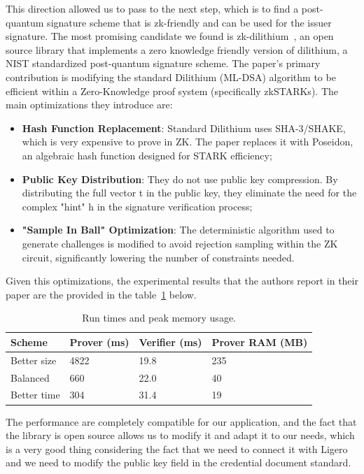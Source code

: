 \documentclass[binding=0.6cm,oneside,noexaminfo]{sapthesis}
\begin{document}
This direction allowed us to pass to the next step, which is to find a post-quantum signature scheme that is zk-friendly and can be used for the issuer signature.
The most promising candidate we found is zk-dilithium~\cite{policharla2023postquantum}, an open source library that implements
a zero knowledge friendly version of dilithium, a NIST standardized post-quantum signature scheme.
The paper's primary contribution is modifying the standard Dilithium (ML-DSA) algorithm to be efficient within a Zero-Knowledge 
proof system (specifically zkSTARKs). The main optimizations they introduce are:
\begin{itemize}
      \item \textbf{Hash Function Replacement}: Standard Dilithium uses SHA-3/SHAKE, which is very expensive to prove in ZK. 
      The paper replaces it with Poseidon, an algebraic hash function designed for STARK efficiency;
      \item \textbf{Public Key Distribution}: They do not use public key compression. By distributing the full vector t in 
      the public key, they eliminate the need for the complex "hint" h in the signature verification process;
      \item \textbf{"Sample In Ball" Optimization}: The deterministic algorithm used to generate challenges is modified to 
      avoid rejection sampling within the ZK circuit, significantly lowering the number of constraints needed.
\end{itemize}
Given this optimizations, the experimental results that the authors report in their paper are the provided in the table~\ref{tab:runtimes_memory} below.


\begin{table}[ht]
  \centering
  \caption{Run times and peak memory usage.}
  \label{tab:runtimes_memory}
  \small
  \begin{tabularx}{\textwidth}{@{}l X X X@{}}
    \toprule
    \textbf{Scheme} & \textbf{Prover (ms)} & \textbf{Verifier (ms)} & \textbf{Prover RAM (MB)} \\
    \midrule
    Better size & 4822 & 19.8 & 235 \\
    Balanced    & 660  & 22.0 & 40 \\
    Better time & 304  & 31.4 & 19 \\
    \bottomrule
  \end{tabularx}
\end{table}

The performance are completely compatible for our application, and the fact that the library is open source allows us to modify it 
and adapt it to our needs, which is a very good thing considering the fact that we need to connect it with Ligero and we need to
modify the public key field in the credential document standard.
\end{document}
